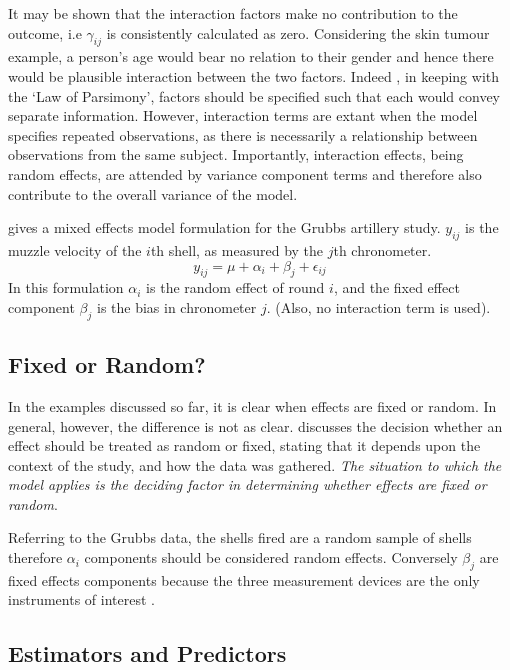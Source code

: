 \documentclass[12pt, a4paper]{report}
\begin{document}
It may be shown that the interaction factors make no contribution
to the outcome, i.e $\gamma_{ij}$ is consistently calculated as
zero. Considering the skin tumour example, a person's age would
bear no relation to their gender and hence there would be
plausible interaction between the two factors. Indeed , in keeping
with the `Law of Parsimony', factors should be specified such that
each would convey separate information. However, interaction terms
are extant when the model specifies repeated observations, as
there is necessarily a relationship between observations from the
same subject. Importantly, interaction effects, being random
effects, are attended by variance component terms and therefore
also contribute to the overall variance of the model.

\citet{Searle} gives a mixed effects model formulation for the
Grubbs artillery study. $y_{ij}$ is the muzzle velocity of the
$i$th shell, as measured by the $j$th chronometer.
\begin{equation}
y_{ij} = \mu + \alpha_{i} + \beta_{j}  + \epsilon_{ij}
\end{equation}
In this formulation $\alpha_{i}$ is the random effect of round
$i$, and the fixed effect component $\beta_{j}$ is the bias in
chronometer $j$. (Also, no interaction term is used).

\subsection{Fixed or Random?}

In the examples discussed so far, it is clear when effects are
fixed or random. In general, however, the difference is not as
clear. \citet{Searle} discusses the decision whether an effect
should be treated as random or fixed, stating that it depends upon
the context of the study, and how the data was gathered. \emph{The
situation to which the model applies is the deciding factor in
determining whether effects are fixed or random}.

Referring to the Grubbs data, the shells fired are a random sample
of shells therefore $\alpha_{i}$ components should be considered
random effects. Conversely $\beta_{j}$ are fixed effects
components because the three measurement devices are the only
instruments of interest \citep{Searle}.






\subsection{Estimators and Predictors}
\end{document}

